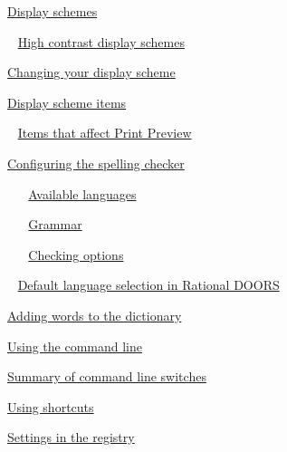 \documentclass[11pt,a4paper]{article}
\begin{document}
\href{https://www.ibm.com/support/knowledgecenter/search/Display%20schemes?scope=SSYQBZ_9.6.1}{Display schemes}

\,\,\, \href{https://www.ibm.com/support/knowledgecenter/search/High%20contrast%20display%20schemes?scope=SSYQBZ_9.6.1}{High contrast display schemes}

\href{https://www.ibm.com/support/knowledgecenter/search/Changing%20your%20display%20scheme?scope=SSYQBZ_9.6.1}{Changing your display scheme}

\href{https://www.ibm.com/support/knowledgecenter/search/Display%20scheme%20items?scope=SSYQBZ_9.6.1}{Display scheme items}

\,\,\, \href{https://www.ibm.com/support/knowledgecenter/search/Items%20that%20affect%20Print%20Preview?scope=SSYQBZ_9.6.1}{Items that affect Print Preview}

\href{https://www.ibm.com/support/knowledgecenter/search/Configuring%20the%20spelling%20checker?scope=SSYQBZ_9.6.1}{Configuring the spelling checker}

\,\,\, \,\,\, \href{https://www.ibm.com/support/knowledgecenter/search/Available%20languages?scope=SSYQBZ_9.6.1}{Available languages}

\,\,\, \,\,\, \href{https://www.ibm.com/support/knowledgecenter/search/Grammar?scope=SSYQBZ_9.6.1}{Grammar}

\,\,\, \,\,\, \href{https://www.ibm.com/support/knowledgecenter/search/Checking%20options?scope=SSYQBZ_9.6.1}{Checking options}

\,\,\, \href{https://www.ibm.com/support/knowledgecenter/search/Default%20language%20selection%20in%20Rational%20DOORS?scope=SSYQBZ_9.6.1}{Default language selection in Rational DOORS}

\href{https://www.ibm.com/support/knowledgecenter/search/Adding%20words%20to%20the%20dictionary?scope=SSYQBZ_9.6.1}{Adding words to the dictionary}

\href{https://www.ibm.com/support/knowledgecenter/search/Using%20the%20command%20line?scope=SSYQBZ_9.6.1}{Using the command line}

\href{https://www.ibm.com/support/knowledgecenter/search/Summary%20of%20command%20line%20switches?scope=SSYQBZ_9.6.1}{Summary of command line switches}

\href{https://www.ibm.com/support/knowledgecenter/search/Using%20shortcuts?scope=SSYQBZ_9.6.1}{Using shortcuts}

\href{https://www.ibm.com/support/knowledgecenter/search/Settings%20in%20the%20registry?scope=SSYQBZ_9.6.1}{Settings in the registry}
\end{document}
